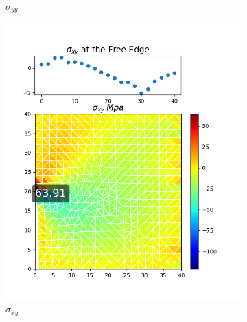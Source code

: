 \documentclass[twoside,twocolumn,10pt]{article}
\begin{document}
\begin{figure}[!ht]
\begin{subfigure}[c]{0.26\textwidth}
    \caption{$\sigma_{yy}$}
    \label{fig:y_triangle_0.05}
  \end{subfigure}%
  \hfill
  \begin{subfigure}[c]{0.26\textwidth}
    \includegraphics[width=1.\linewidth]{Q2_5/Q5_0.05_xy_triangle.png}
    \caption{$\sigma_{xy}$}
    \label{fig:xy_triangle_0.05}
  \end{subfigure}%
  \begin{subfigure}[c]{0.26\textwidth}

\end{subfigure}
\end{figure}
\end{document}
